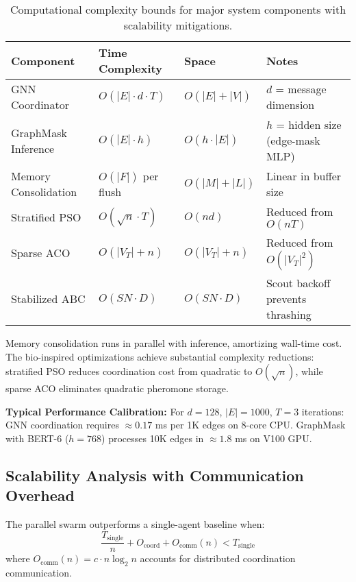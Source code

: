 \documentclass{article}
\begin{document}
\begin{table}[h]
\centering
\caption{Computational complexity bounds for major system components with scalability mitigations.}
\label{tab:complexity_bounds}
\begin{tabular}{llll}
\hline
\textbf{Component} & \textbf{Time Complexity} & \textbf{Space} & \textbf{Notes} \\
\hline
GNN Coordinator & $O(|E| \cdot d \cdot T)$ & $O(|E| + |V|)$ & $d$ = message dimension \\
GraphMask Inference & $O(|E| \cdot h)$ & $O(h \cdot |E|)$ & $h$ = hidden size (edge-mask MLP) \\
Memory Consolidation & $O(|F|)$ per flush & $O(|M| + |L|)$ & Linear in buffer size \\
Stratified PSO & $O(\sqrt{n} \cdot T)$ & $O(nd)$ & Reduced from $O(nT)$ \\
Sparse ACO & $O(|V_T| + n)$ & $O(|V_T| + n)$ & Reduced from $O(|V_T|^2)$ \\
Stabilized ABC & $O(SN \cdot D)$ & $O(SN \cdot D)$ & Scout backoff prevents thrashing \\
\hline
\end{tabular}
\end{table}

Memory consolidation runs in parallel with inference, amortizing wall-time cost. The bio-inspired optimizations achieve substantial complexity reductions: stratified PSO reduces coordination cost from quadratic to $O(\sqrt{n})$, while sparse ACO eliminates quadratic pheromone storage.

\textbf{Typical Performance Calibration:} For $d = 128$, $|E| = 1000$, $T = 3$ iterations: GNN coordination requires $\approx 0.17$ ms per 1K edges on 8-core CPU. GraphMask with BERT-6 ($h = 768$) processes 10K edges in $\approx 1.8$ ms on V100 GPU.

\subsection{Scalability Analysis with Communication Overhead}

The parallel swarm outperforms a single-agent baseline when:
\begin{equation}
\label{eq:scalability_condition}
\frac{T_{\text{single}}}{n} + O_{\text{coord}} + O_{\text{comm}}(n) < T_{\text{single}}
\end{equation}
where $O_{\text{comm}}(n) = c \cdot n \log_2 n$ accounts for distributed coordination communication.
\end{document}
